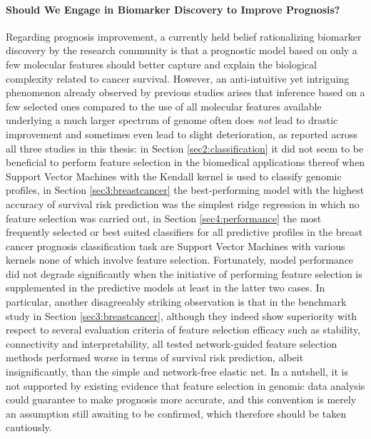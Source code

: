\paragraph{Should We Engage in Biomarker Discovery to Improve Prognosis?} Regarding prognosis improvement, a currently held belief rationalizing biomarker discovery by the research community is that a prognostic model based on only a few molecular features should better capture and explain the biological complexity related to cancer survival. However, an anti-intuitive yet intriguing phenomenon already observed by previous studies \cite{Haury2011influence} arises that inference based on a few selected ones compared to the use of all molecular features available underlying a much larger spectrum of genome often does \emph{not} lead to drastic improvement and sometimes even lead to slight deterioration, as reported across all three studies in this thesis: in Section \ref{sec2:classification} it did not seem to be beneficial to perform feature selection in the biomedical applications thereof when Support Vector Machines with the Kendall kernel is used to classify genomic profiles, in Section \ref{sec3:breastcancer} the best-performing model with the highest accuracy of survival risk prediction was the simplest ridge regression in which no feature selection was carried out, in Section \ref{sec4:performance} the most frequently selected or best suited classifiers for all predictive profiles in the breast cancer prognosis classification task are Support Vector Machines with various kernels none of which involve feature selection. Fortunately, model performance did not degrade significantly when the initiative of performing feature selection is supplemented in the predictive models at least in the latter two cases. In particular, another disagreeably striking observation is that in the benchmark study in Section \ref{sec3:breastcancer}, although they indeed show superiority with respect to several evaluation criteria of feature selection efficacy such as stability, connectivity and interpretability, all tested network-guided feature selection methods performed worse in terms of survival risk prediction, albeit insignificantly, than the simple and network-free elastic net. In a nutshell, it is not supported by existing evidence that feature selection in genomic data analysis could guarantee to make prognosis more accurate, and this convention is merely an assumption still awaiting to be confirmed, which therefore should be taken cautiously.


